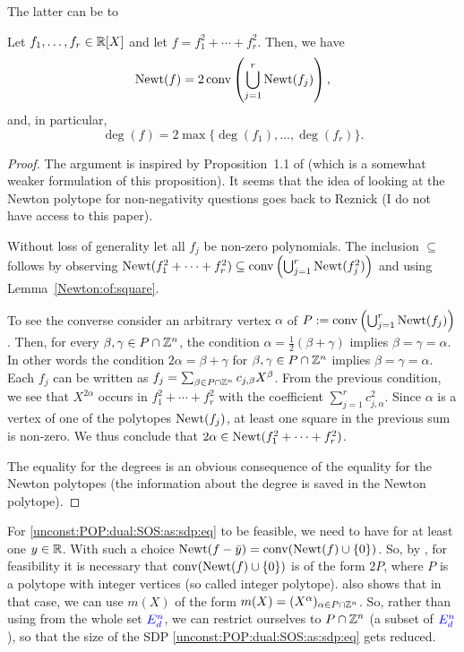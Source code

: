 The latter can be  to

\begin{proposition} \label{newton:SOS}
	Let $f_1,\ldots,f_r \in \mathbb{R}[X]$ and let $f=f_1^2 + \cdots + f_r^2$. Then, we have
	\[
		\operatorname{Newt}(f) = 2 \operatorname{conv} \left( \bigcup_{j=1}^r \operatorname{Newt}(f_j) \right),
	\]
	and, in particular, 
	\[
		\deg(f) = 2 \max \{\deg(f_1),\ldots,\deg(f_r)\}. 
	\]
\end{proposition} 
\begin{proof}
	The argument is inspired by Proposition~1.1 of \cite{chua2016gram} (which is a somewhat weaker formulation of this proposition). It seems that the idea of looking at the Newton polytope for non-negativity questions goes back to Reznick \cite{Reznick1978} (I do not have access to this paper). 
	
	Without loss of generality let all $f_j$ be non-zero polynomials. The inclusion $\subseteq$ follows by observing $\operatorname{Newt}(f_1^2 + \cdots + f_r^2) \subseteq \operatorname{conv} \left(\bigcup_{j=1}^r \operatorname{Newt}(f_j^2) \right)$ and using Lemma~\ref{Newton:of:square}.
	
	To see the converse consider an arbitrary vertex $\alpha$ of $P:=\operatorname{conv} \left( \bigcup_{j=1}^r \operatorname{Newt}(f_j) \right)$. Then, for every $\beta,\gamma \in P \cap \mathbb{Z}^n$, the condition $\alpha = \frac{1}{2}(\beta + \gamma)$ implies $\beta = \gamma = \alpha$.  In other words the condition $2 \alpha = \beta+ \gamma$ for $\beta, \gamma \in P \cap \mathbb{Z}^n$ implies $\beta=\gamma =\alpha$. Each $f_j$ can be written as $f_j = \sum_{\beta \in P \cap \mathbb{Z}^n} c_{j,\beta} X^\beta$. From the previous condition, we see that $X^{2 \alpha}$ occurs in $f_1^2 + \cdots + f_r^2$ with the coefficient $\sum_{j=1}^r c_{j,\alpha}^2$. Since $\alpha$ is a vertex of one of the polytopes $\operatorname{Newt}(f_j)$, at least one square in the previous sum is non-zero. We thus conclude that $2 \alpha \in \operatorname{Newt}(f_1^2 + \cdots +f_r^2)$. 
	
	The equality for the degrees is an obvious consequence of the equality for the Newton polytopes (the information about the degree is saved in the Newton polytope). 
\end{proof}

For \eqref{unconst:POP:dual:SOS:as:sdp:eq} to be feasible, we need to have  for at least one $y \in \mathbb{R}$.
With such a choice $\operatorname{Newt}(f - \bar y) = \operatorname{conv}(\operatorname{Newt}(f) \cup \{0\})$. So, by ,  for feasibility it is necessary that $\operatorname{conv}(\operatorname{Newt}(f) \cup \{0\})$ is of the form $2 P$, where $P$ is a polytope with integer vertices (so called integer polytope).  also shows that in that case, we can use $m(X)$ of the form $m(X) = (X^\alpha)_{\alpha \in P \cap \mathbb{Z}^n}$. So, rather than using  from the whole set $\textcolor{blue}{E^n_d}$, we can restrict ourselves to $P \cap \mathbb{Z}^n$ (a subset of $\textcolor{blue}{E^n_d}$), so that the size of the SDP \eqref{unconst:POP:dual:SOS:as:sdp:eq} gets reduced. 

